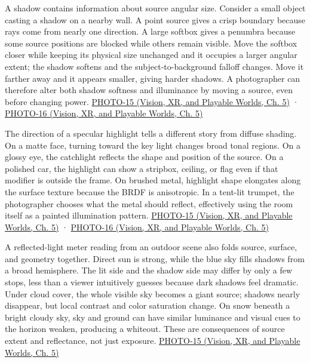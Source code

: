 A shadow contains information about source angular size. Consider a small object casting a shadow on a nearby wall. A point source gives a crisp boundary because rays come from nearly one direction. A large softbox gives a penumbra because some source positions are blocked while others remain visible. Move the softbox closer while keeping its physical size unchanged and it occupies a larger angular extent; the shadow softens and the subject-to-background falloff changes. Move it farther away and it appears smaller, giving harder shadows. A photographer can therefore alter both shadow softness and illuminance by moving a source, even before changing power. \href{../07-Vision-XR-and-Playable-Worlds/main.pdf\#nameddest=04-visual-computing-ii-ch036-photo-15---photography-session-15}{PHOTO-15 (Vision, XR, and Playable Worlds, Ch. 5)} · \href{../07-Vision-XR-and-Playable-Worlds/main.pdf\#nameddest=04-visual-computing-ii-ch036-photo-16---photography-session-16}{PHOTO-16 (Vision, XR, and Playable Worlds, Ch. 5)}

The direction of a specular highlight tells a different story from diffuse shading. On a matte face, turning toward the key light changes broad tonal regions. On a glossy eye, the catchlight reflects the shape and position of the source. On a polished car, the highlight can show a stripbox, ceiling, or flag even if that modifier is outside the frame. On brushed metal, highlight shape elongates along the surface texture because the BRDF is anisotropic. In a tent-lit trumpet, the photographer chooses what the metal should reflect, effectively using the room itself as a painted illumination pattern. \href{../07-Vision-XR-and-Playable-Worlds/main.pdf\#nameddest=04-visual-computing-ii-ch036-photo-15---photography-session-15}{PHOTO-15 (Vision, XR, and Playable Worlds, Ch. 5)} · \href{../07-Vision-XR-and-Playable-Worlds/main.pdf\#nameddest=04-visual-computing-ii-ch036-photo-16---photography-session-16}{PHOTO-16 (Vision, XR, and Playable Worlds, Ch. 5)}

A reflected-light meter reading from an outdoor scene also folds source, surface, and geometry together. Direct sun is strong, while the blue sky fills shadows from a broad hemisphere. The lit side and the shadow side may differ by only a few stops, less than a viewer intuitively guesses because dark shadows feel dramatic. Under cloud cover, the whole visible sky becomes a giant source; shadows nearly disappear, but local contrast and color saturation change. On snow beneath a bright cloudy sky, sky and ground can have similar luminance and visual cues to the horizon weaken, producing a whiteout. These are consequences of source extent and reflectance, not just exposure. \href{../07-Vision-XR-and-Playable-Worlds/main.pdf\#nameddest=04-visual-computing-ii-ch036-photo-15---photography-session-15}{PHOTO-15 (Vision, XR, and Playable Worlds, Ch. 5)}

